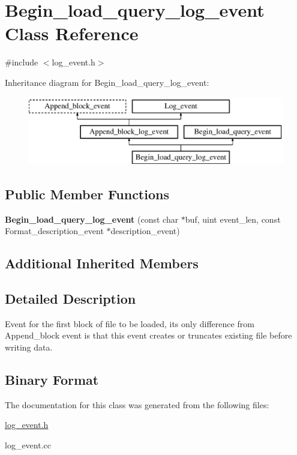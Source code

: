 \hypertarget{classBegin__load__query__log__event}{}\section{Begin\+\_\+load\+\_\+query\+\_\+log\+\_\+event Class Reference}
\label{classBegin__load__query__log__event}


{\ttfamily \#include $<$log\+\_\+event.\+h$>$}

Inheritance diagram for Begin\+\_\+load\+\_\+query\+\_\+log\+\_\+event\+:\begin{figure}[H]
\begin{center}
\leavevmode
\includegraphics[height=3.000000cm]{classBegin__load__query__log__event}
\end{center}
\end{figure}
\subsection*{Public Member Functions}
\begin{DoxyCompactItemize}
\item 
\mbox{\label{classBegin__load__query__log__event_aca8ad021045b6e8cc3fab22e04163623}} 
{\bfseries Begin\+\_\+load\+\_\+query\+\_\+log\+\_\+event} (const char $\ast$buf, uint event\+\_\+len, const Format\+\_\+description\+\_\+event $\ast$description\+\_\+event)
\end{DoxyCompactItemize}
\subsection*{Additional Inherited Members}


\subsection{Detailed Description}
Event for the first block of file to be loaded, its only difference from Append\+\_\+block event is that this event creates or truncates existing file before writing data.\hypertarget{classBegin__load__query__log__event_Begin_load_query_log_event_binary_format}{}\subsection{Binary Format}\label{classBegin__load__query__log__event_Begin_load_query_log_event_binary_format}


The documentation for this class was generated from the following files\+:\begin{DoxyCompactItemize}
\item 
\mbox{\hyperlink{log__event_8h}{log\+\_\+event.\+h}}\item 
log\+\_\+event.\+cc\end{DoxyCompactItemize}
